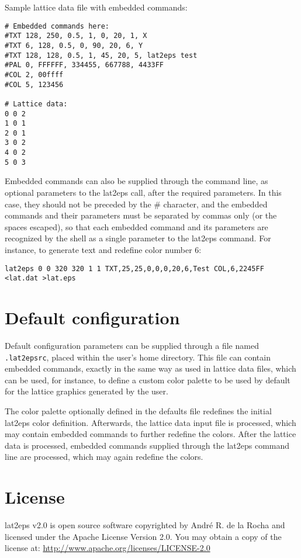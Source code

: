 \documentclass[a4paper]{article}
\begin{document}
Sample lattice data file with embedded commands:
\bigbreak

\begin{lstlisting}
# Embedded commands here:
#TXT 128, 250, 0.5, 1, 0, 20, 1, X
#TXT 6, 128, 0.5, 0, 90, 20, 6, Y
#TXT 128, 128, 0.5, 1, 45, 20, 5, lat2eps test
#PAL 0, FFFFFF, 334455, 667788, 4433FF
#COL 2, 00ffff
#COL 5, 123456

# Lattice data:
0 0 2
1 0 1
2 0 1
3 0 2
4 0 2
5 0 3
\end{lstlisting}

\bigbreak

Embedded commands can also be supplied through the command line, as optional parameters to the lat2eps call, after the required parameters. In this case, they should not be preceded by the \# character, and the embedded commands and their parameters must be separated by commas only (or the spaces escaped), so that each embedded command and its parameters are recognized by the shell as a single parameter to the lat2eps command. For instance, to generate text and redefine color number 6:
\bigbreak

\texttt{lat2eps 0 0 320 320 1 1 TXT,25,25,0,0,0,20,6,Test COL,6,2245FF <lat.dat >lat.eps}
\bigbreak


\section{Default configuration}

Default configuration parameters can be supplied through a file named \texttt{.lat2epsrc}, placed within the user's home directory. This file can contain embedded commands, exactly in the same way as used in lattice data files, which can be used, for instance, to define a custom color palette to be used by default for the lattice graphics generated by the user.
\bigbreak

The color palette optionally defined in the defaults file redefines the initial lat2eps color definition. Afterwards, the lattice data input file is processed, which may contain embedded commands to further redefine the colors. After the lattice data is processed, embedded commands supplied through the lat2eps command line are processed, which may again redefine the colors.
\bigbreak


\section{License}

lat2eps v2.0 is open source software copyrighted by André R. de la Rocha and licensed under the Apache License Version 2.0. You may obtain a copy of the license at: \url{http://www.apache.org/licenses/LICENSE-2.0}
\end{document}
